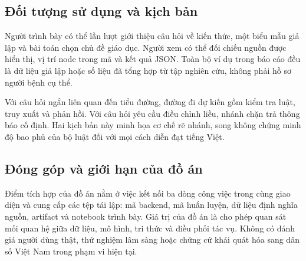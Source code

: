 \subsection{Đối tượng sử dụng và kịch bản}
Người trình bày có thể lần lượt giới thiệu câu hỏi về kiến thức, một biểu mẫu giả lập và bài toán chọn chủ đề giáo dục. Người xem có thể đối chiếu nguồn được hiển thị, vị trí node trong mã và kết quả JSON. Toàn bộ ví dụ trong báo cáo đều là dữ liệu giả lập hoặc số liệu đã tổng hợp từ tập nghiên cứu, không phải hồ sơ người bệnh cụ thể.

Với câu hỏi ngắn liên quan đến tiểu đường, đường đi dự kiến gồm kiểm tra luật, truy xuất và phản hồi. Với câu hỏi yêu cầu điều chỉnh liều, nhánh chặn trả thông báo cố định. Hai kịch bản này minh họa cơ chế rẽ nhánh, song không chứng minh độ bao phủ của bộ luật đối với mọi cách diễn đạt tiếng Việt.
\subsection{Đóng góp và giới hạn của đồ án}
Điểm tích hợp của đồ án nằm ở việc kết nối ba dòng công việc trong cùng giao diện và cung cấp các tệp tái lập: mã backend, mã huấn luyện, dữ liệu định nghĩa nguồn, artifact và notebook trình bày. Giá trị của đồ án là cho phép quan sát mối quan hệ giữa dữ liệu, mô hình, tri thức và điều phối tác vụ. Không có đánh giá người dùng thật, thử nghiệm lâm sàng hoặc chứng cứ khái quát hóa sang dân số Việt Nam trong phạm vi hiện tại.
